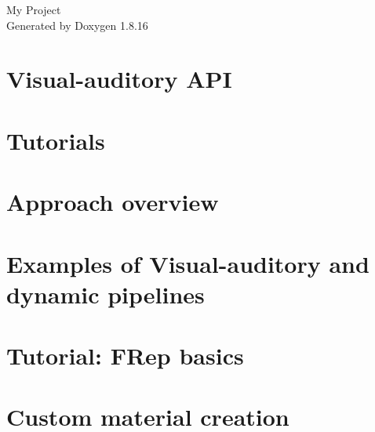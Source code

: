 \let\mypdfximage\pdfximage\def\pdfximage{\immediate\mypdfximage}\documentclass[twoside]{book}
\newcommand{\+}{\discretionary{\mbox{\scriptsize$\hookleftarrow$}}{}{}}
\newcommand{\clearemptydoublepage}{%
  \newpage{\pagestyle{empty}\cleardoublepage}%
}
\begin{document}
\hypersetup{pageanchor=false,
             bookmarksnumbered=true,
             pdfencoding=unicode
            }
\begin{titlepage}
\vspace*{7cm}
\begin{center}%
{\Large My Project }\\
\vspace*{1cm}
{\large Generated by Doxygen 1.8.16}\\
\end{center}
\end{titlepage}
\clearemptydoublepage
{}
\tableofcontents
\clearemptydoublepage
{}
\hypersetup{pageanchor=true}

\chapter{Visual-\/auditory A\+PI}
\label{index}\hypertarget{index}{}
\chapter{Tutorials}
\label{md_core_src_doc_alltutorials}

\chapter{Approach overview}
\label{md_core_src_doc_approach}

\chapter{Examples of Visual-\/auditory and dynamic pipelines}
\label{md_core_src_doc_examples}

\chapter{Tutorial\+: F\+Rep basics}
\label{md_core_src_doc_freptutorial}

\chapter{Custom material creation}
\label{md_core_src_doc_materialtutorial}

\end{document}
